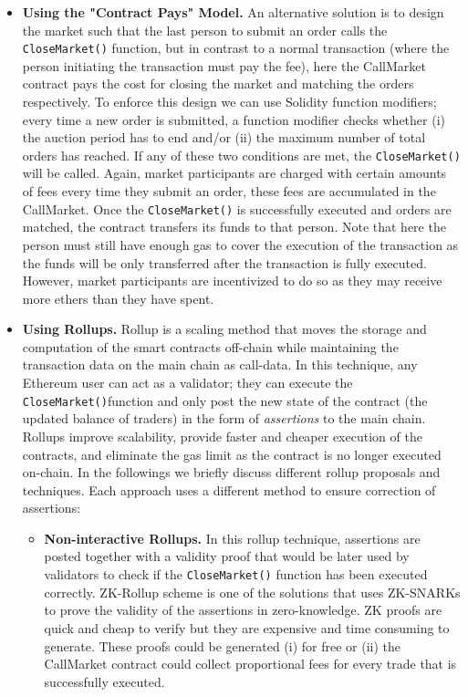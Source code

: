 \begin{itemize}
\begin{itemize}
\item \textbf{Using the "Contract Pays" Model.} An alternative solution is to design the market such that the last person to submit an order calls the \texttt{CloseMarket()} function, but in contrast to a normal transaction (where the person initiating the transaction must pay the fee), here the CallMarket contract pays the cost for closing the market and matching the orders respectively. To enforce this design we can use Solidity function modifiers; every time a new order is submitted, a function modifier checks whether (i) the auction period has to end and/or (ii) the maximum number of total orders has reached. If any of these two conditions are met, the \texttt{CloseMarket()} will be called. Again, market participants are charged with certain amounts of fees every time they submit an order, these fees are accumulated in the CallMarket. Once the \texttt{CloseMarket()} is successfully executed and orders are matched, the contract transfers its funds to that person. Note that here the person must still have enough gas to cover the execution of the transaction as the funds will be only transferred after the transaction is fully executed. However, market participants are incentivized to do so as they may receive more ethers than they have spent.


\item \textbf{Using Rollups.} Rollup is a scaling method that moves the storage and computation of the smart contracts off-chain while maintaining the transaction data on the main chain as call-data. In this technique, any Ethereum user can act as a validator; they can execute the \texttt{CloseMarket()}function and only post the new state of the contract (the updated balance of traders) in the form of \textit{assertions} to the main chain. Rollups improve scalability, provide faster and cheaper execution of the contracts, and eliminate the gas limit as the contract is no longer executed on-chain.
In the followings we briefly discuss different rollup proposals and techniques. Each approach uses a different method to ensure correction of assertions:


\begin{itemize}

\item \textbf{{Non-interactive Rollups.}} In this rollup technique, assertions are posted together with a validity proof that would be later used by validators to check if the \texttt{CloseMarket()} function has been executed correctly. ZK-Rollup scheme is one of the solutions that uses ZK-SNARKs to prove the validity of the assertions in zero-knowledge. ZK proofs are quick and cheap to verify but they are expensive and time consuming to generate. These proofs could be generated (i) for free or (ii) the CallMarket contract could collect proportional fees for every trade that is successfully executed.


\end{itemize}
\end{itemize}
\end{itemize}
